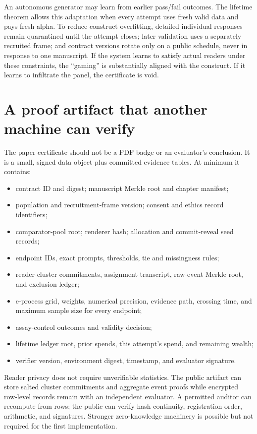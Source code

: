 \documentclass[11pt]{article}
\theoremstyle{remark}
\begin{document}
An autonomous generator may learn from earlier pass/fail outcomes. The lifetime theorem
allows this adaptation when every attempt uses fresh valid data and pays fresh alpha. To
reduce construct overfitting, detailed individual responses remain quarantined until the
attempt closes; later validation uses a separately recruited frame; and contract versions
rotate only on a public schedule, never in response to one manuscript. If the system learns
to satisfy actual readers under these constraints, the ``gaming'' is substantially aligned
with the construct. If it learns to infiltrate the panel, the certificate is void.

\section{A proof artifact that another machine can verify}

The paper certificate should not be a PDF badge or an evaluator's conclusion. It is a small,
signed data object plus committed evidence tables. At minimum it contains:

\begin{itemize}
  \item contract ID and digest; manuscript Merkle root and chapter manifest;
  \item population and recruitment-frame version; consent and ethics record identifiers;
  \item comparator-pool root; renderer hash; allocation and commit-reveal seed records;
  \item endpoint IDs, exact prompts, thresholds, tie and missingness rules;
  \item reader-cluster commitments, assignment transcript, raw-event Merkle root, and
  exclusion ledger;
  \item e-process grid, weights, numerical precision, evidence path, crossing time, and
  maximum sample size for every endpoint;
  \item assay-control outcomes and validity decision;
  \item lifetime ledger root, prior spends, this attempt's spend, and remaining wealth;
  \item verifier version, environment digest, timestamp, and evaluator signature.
\end{itemize}

Reader privacy does not require unverifiable statistics. The public artifact can store salted
cluster commitments and aggregate event proofs while encrypted row-level records remain with
an independent evaluator. A permitted auditor can recompute from rows; the public can verify
hash continuity, registration order, arithmetic, and signatures. Stronger zero-knowledge
machinery is possible but not required for the first implementation.
\end{document}
